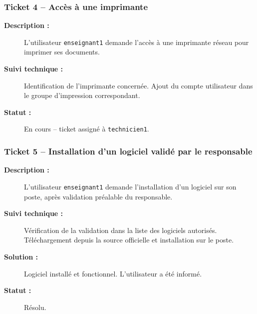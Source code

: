 \documentclass[a4paper,11pt]{article}
\begin{document}
\subsubsection*{Ticket 4 -- Accès à une imprimante}
\begin{description}
    \item[\textbf{Description :}] L'utilisateur \texttt{enseignant1} demande l'accès à une imprimante réseau pour imprimer ses documents.
    \item[\textbf{Suivi technique :}] Identification de l'imprimante concernée. Ajout du compte utilisateur dans le groupe d'impression correspondant.
    \item[\textbf{Statut :}] En cours -- ticket assigné à \texttt{technicien1}.
\end{description}

\subsubsection*{Ticket 5 -- Installation d'un logiciel validé par le responsable}
\begin{description}
    \item[\textbf{Description :}] L'utilisateur \texttt{enseignant1} demande l'installation d'un logiciel sur son poste, après validation préalable du responsable.
    \item[\textbf{Suivi technique :}] Vérification de la validation dans la liste des logiciels autorisés. Téléchargement depuis la source officielle et installation sur le poste.
    \item[\textbf{Solution :}] Logiciel installé et fonctionnel. L'utilisateur a été informé.
    \item[\textbf{Statut :}] Résolu.
\end{description}
\end{document}
